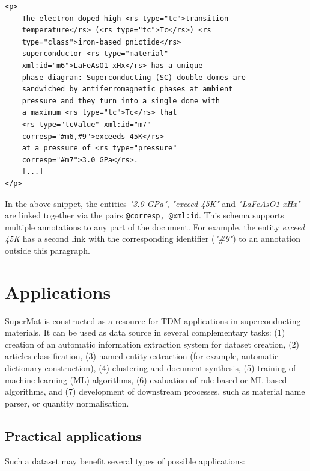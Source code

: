 \begin{verbatim}
<p>
    The electron-doped high-<rs type="tc">transition-
    temperature</rs> (<rs type="tc">Tc</rs>) <rs 
    type="class">iron-based pnictide</rs> 
    superconductor <rs type="material" 
    xml:id="m6">LaFeAsO1-xHx</rs> has a unique 
    phase diagram: Superconducting (SC) double domes are 
    sandwiched by antiferromagnetic phases at ambient 
    pressure and they turn into a single dome with 
    a maximum <rs type="tc">Tc</rs> that 
    <rs type="tcValue" xml:id="m7" 
    corresp="#m6,#9">exceeds 45K</rs> 
    at a pressure of <rs type="pressure" 
    corresp="#m7">3.0 GPa</rs>. 
    [...]
</p>
\end{verbatim}

In the above snippet, the entities \textit{"3.0 GPa"}, \textit{"exceed 45K"} and \textit{"LaFeAsO1-xHx"} are linked together via the pairs \texttt{@corresp, @xml:id}. 
This schema supports multiple annotations to any part of the document. 
For example, the entity \textit{exceed 45K} has a second link with the corresponding identifier (\textit{"\#9"}) to an annotation outside this paragraph.


\section{Applications}
\label{sec:applications}
SuperMat is constructed as a resource for TDM applications in superconducting materials. It can be used as data source in several complementary tasks: 
(1) creation of an automatic information extraction system for dataset creation,
(2) articles classification, 
(3) named entity extraction (for example, automatic dictionary construction), 
(4) clustering and document synthesis,
(5) training of machine learning (ML) algorithms,
(6) evaluation of rule-based or ML-based algorithms, and 
(7) development of downstream processes, such as material name parser, or quantity normalisation.

\subsection{Practical applications}
Such a dataset may benefit several types of possible applications: 

